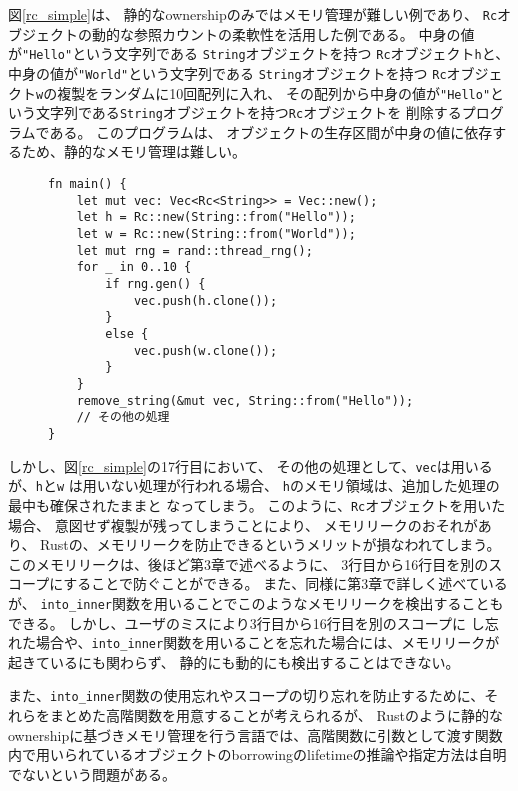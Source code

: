 \documentclass{sumiilab-paper}
\theoremstyle{mystyle}
\numberwithin{definition}{chapter} %
\begin{document}
図\ref{rc_simple}は、
静的なownershipのみではメモリ管理が難しい例であり、
\texttt{Rc}オブジェクトの動的な参照カウントの柔軟性を活用した例である。
中身の値が\texttt{"Hello"}という文字列である
\texttt{String}オブジェクトを持つ
\texttt{Rc}オブジェクト\texttt{h}と、
中身の値が\texttt{"World"}という文字列である
\texttt{String}オブジェクトを持つ
\texttt{Rc}オブジェクト\texttt{w}の複製をランダムに10回配列に入れ、
その配列から中身の値が\texttt{"Hello"}という文字列である\texttt{String}オブジェクトを持つ\texttt{Rc}オブジェクトを
削除するプログラムである。
このプログラムは、
オブジェクトの生存区間が中身の値に依存するため、静的なメモリ管理は難しい。
\begin{figure}[htp]
\begin{lstlisting}[caption=静的なメモリ管理では柔軟性に欠ける例, label=rc_simple, captionpos=b]
fn main() {
    let mut vec: Vec<Rc<String>> = Vec::new();
    let h = Rc::new(String::from("Hello"));
    let w = Rc::new(String::from("World"));
    let mut rng = rand::thread_rng();
    for _ in 0..10 {
        if rng.gen() {
            vec.push(h.clone());
        }
        else {
            vec.push(w.clone());
        }
    }
    remove_string(&mut vec, String::from("Hello"));
    // その他の処理
}
\end{lstlisting}
\end{figure}

しかし、図\ref{rc_simple}の17行目において、
その他の処理として、\texttt{vec}は用いるが、\texttt{h}と\texttt{w}
は用いない処理が行われる場合、
\texttt{h}のメモリ領域は、追加した処理の最中も確保されたままと
なってしまう。
このように、\texttt{Rc}オブジェクトを用いた場合、
意図せず複製が残ってしまうことにより、
メモリリークのおそれがあり、
Rustの、メモリリークを防止できるというメリットが損なわれてしまう。
このメモリリークは、後ほど第3章で述べるように、
3行目から16行目を別のスコープにすることで防ぐことができる。
また、同様に第3章で詳しく述べているが、
\texttt{into\_inner}関数を用いることでこのようなメモリリークを検出することもできる。
しかし、ユーザのミスにより3行目から16行目を別のスコープに
し忘れた場合や、\texttt{into\_inner}関数を用いることを忘れた場合には、メモリリークが起きているにも関わらず、
静的にも動的にも検出することはできない。

また、\texttt{into\_inner}関数の使用忘れやスコープの切り忘れを防止するために、それらをまとめた高階関数を用意することが考えられるが、
Rustのように静的なownershipに基づきメモリ管理を行う言語では、高階関数に引数として渡す関数内で用いられているオブジェクトのborrowingのlifetimeの推論や指定方法は自明でないという問題がある。
\end{document}
